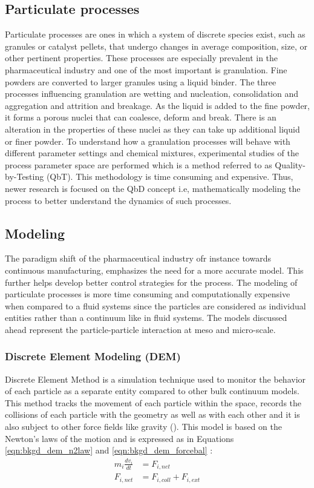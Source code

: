 \documentclass[preprint,11pt,authoryear]{elsarticle}
\begin{document}
\subsection{Particulate processes}
Particulate processes are ones in which a system of discrete species exist, such as granules 
or catalyst pellets, that undergo changes in average composition, size, or other pertinent 
properties. These processes are especially prevalent in the pharmaceutical industry and one of the 
most important is granulation. 
Fine powders are converted to larger granules using a liquid binder. The three processes 
influencing granulation are wetting and nucleation, consolidation and aggregation and attrition and 
breakage\citep{Iveson2001}\citep{Cameron2005}. As the liquid is added to the fine powder, it 
forms a porous nuclei that can coalesce, deform and break\citep{Barrasso2015ces}. There is an 
alteration in the properties of these nuclei as they can take up additional liquid or finer powder.
To understand how a granulation processes will behave with different parameter settings and 
chemical mixtures, experimental studies of the process parameter space are performed which is a 
method referred to as Quality-by-Testing (QbT). This methodology is time consuming and 
expensive. Thus, newer research is focused on the QbD concept i.e, 
mathematically modeling the process to better understand the dynamics of such processes.

\subsection{Modeling}
The paradigm shift of the pharmaceutical industry ofr instance towards continuous manufacturing, 
emphasizes the need for a more accurate model. This further helps develop better control strategies 
for the process. The modeling of particulate processes is more time consuming and computationally 
expensive when compared to a fluid systems since the particles are considered as individual entities 
rather than a continuum like in fluid systems. The models discussed ahead represent the 
particle-particle interaction at meso and micro-scale.
\subsubsection{Discrete Element Modeling (DEM)}
 Discrete Element Method is a simulation technique used to monitor the behavior of each particle 
as a separate entity compared to other bulk continuum models. This method tracks the movement of 
each particle within the space, records the collisions of each particle with the geometry as well 
as with each other and it is also subject to other force fields like gravity (\cite{Barrasso2015cerd}). This 
model is based on the Newton's laws of the motion and is expressed as in Equations 
\ref{eqn:bkgd_dem_n2law} and  \ref{eqn:bkgd_dem_forcebal} : \\
\begin{align}
m_i\frac{dv_i}{dt} &= F_{i,net} \label{eqn:bkgd_dem_n2law} \\
F_{i,net} &=  F_{i,coll} +  F_{i,ext} \label{eqn:bkgd_dem_forcebal}
\end{align}
\end{document}
